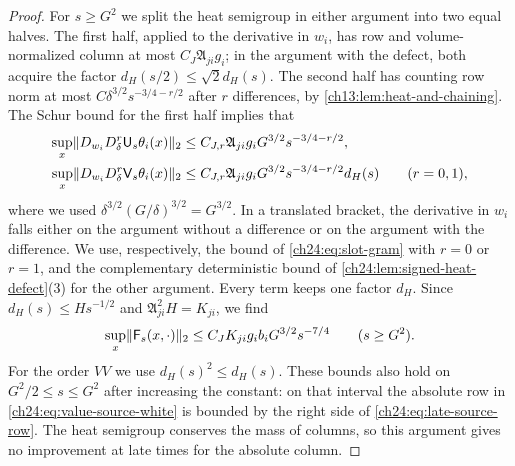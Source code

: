\begin{proof}
For $s\ge G^2$ we split the heat semigroup in either argument into two equal halves. The first half, applied to the derivative in $w_i$, has row and volume-normalized column at most $C_J\mathfrak A_{ji}g_i$; in the argument with the defect, both acquire the factor $d_H(s/2)\le\sqrt2d_H(s)$. The second half has counting row norm at most $C\delta^{3/2}s^{-3/4-r/2}$ after $r$ differences, by \cref{ch13:lem:heat-and-chaining}. The Schur bound for the first half implies that
\begin{equation}\label{ch24:eq:slot-gram}
 \begin{split}
 \sup_x\lVert D_{w_i}D_\delta^r\mathsf U_s\theta_i(x)\rVert_2&\le C_{J,r}\mathfrak A_{ji}g_iG^{3/2}s^{-3/4-r/2},\\
 \sup_x\lVert D_{w_i}D_\delta^r\mathsf V_s\theta_i(x)\rVert_2&\le C_{J,r}\mathfrak A_{ji}g_iG^{3/2}s^{-3/4-r/2}d_H(s)\qquad(r=0,1),
 \end{split}
\end{equation}
where we used $\delta^{3/2}(G/\delta)^{3/2}=G^{3/2}$. In a translated bracket, the derivative in $w_i$ falls either on the argument without a difference or on the argument with the difference. We use, respectively, the bound of \eqref{ch24:eq:slot-gram} with $r=0$ or $r=1$, and the complementary deterministic bound of \cref{ch24:lem:signed-heat-defect}(3) for the other argument. Every term keeps one factor $d_H$. Since $d_H(s)\le Hs^{-1/2}$ and $\mathfrak A_{ji}^2H=K_{ji}$, we find
\begin{equation}\label{ch24:eq:late-source-row}
 \sup_x\lVert \mathsf F_s(x,\cdot)\rVert_2\le C_JK_{ji}g_ib_iG^{3/2}s^{-7/4}\qquad(s\ge G^2).
\end{equation}
For the order $VV$ we use $d_H(s)^2\le d_H(s)$. These bounds also hold on $G^2/2\le s\le G^2$ after increasing the constant: on that interval the absolute row in \eqref{ch24:eq:value-source-white} is bounded by the right side of \eqref{ch24:eq:late-source-row}. The heat semigroup conserves the mass of columns, so this argument gives no improvement at late times for the absolute column.


\end{proof}
